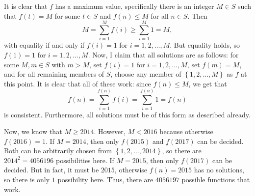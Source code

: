 It is clear that $f$ has a maximum value, specifically there is an integer $M\in S$ such that $f\left(t\right)=M$ for some $t\in S$ and $f\left(n\right)\leq M$ for all $n\in S$. Then \[M=\displaystyle\sum_{i=1}^Mf\left(i\right)\geq\displaystyle\sum_{i=1}^M1=M,\] with equality if and only if $f\left(i\right)=1$ for $i=1,2,\ldots,M$. But equality holds, so $f\left(1\right)=1$ for $i=1,2,\ldots,M$. Now, I claim that all solutions are as follows: for some $M,m\in S$ with $m>M$, set $f\left(i\right)=1$ for $i=1,2,\ldots,M$, set $f\left(m\right)=M$, and for all remaining members of $S$, choose any member of $\left\{1,2,\ldots,M\right\}$ as $f$ at this point. It is clear that all of these work: since $f\left(n\right)\leq M$, we get that \[f\left(n\right)=\displaystyle\sum_{i=1}^{f\left(n\right)}f\left(i\right)=\displaystyle\sum_{i=1}^{f\left(n\right)}1=f\left(n\right)\] is consistent. Furthermore, all solutions must be of this form as described already.

Now, we know that $M\geq2014$. However, $M<2016$ because otherwise $f\left(2016\right)=1$. If $M=2014$, then only $f\left(2015\right)$ and $f\left(2017\right)$ can be decided. Both can be arbitrarily chosen from $\left\{1,2,\ldots,2014\right\}$, so there are $2014^2=4056196$ possibilities here. If $M=2015$, then only $f\left(2017\right)$ can be decided. But in fact, it must be $2015$, otherwise $f\left(n\right)=2015$ has no solutions, so there is only $1$ possibility here. Thus, there are $\boxed{4056197}$ possible functions that work.